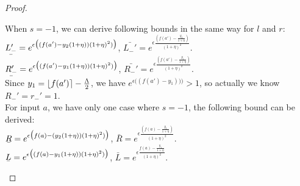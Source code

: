 \documentclass[a4paper,11pt]{article}
\begin{document}
\begin{proof}
\begin{itemize}
		When $s = -1$, we can derive following bounds in the same way for $l$ and $r$:\\
		$\ubar{L_-'} = e^{\epsilon 
				\big( (f(a') - y_2(1 + \eta)) (1 + \eta)^2) \big)}$,
		$\bar{L_-'} = e^{\epsilon 
				\frac{(f(a') - \frac{y_2}{1 + \eta})}{(1 + \eta)^2}}$.\\
		$\ubar{R_-'} = e^{\epsilon 
				\big( (f(a') - y_1(1 + \eta)) (1 + \eta)^2) \big)}$, 
		$\bar{R_-'} = e^{\epsilon 
				\frac{(f(a') - \frac{y_1}{1 + \eta})}{(1 + \eta)^2}}$.\\
		Since $y_1 = \lfloor f(a') \rceil - \frac{\Lambda}{2}$, 
		we have $e^{\epsilon \big( (f(a') - y_1)) \big)} > 1$, so actually we know $R_-' = r_-' = 1$.
		\\
		For input $a$, we have only one case where $s = -1$, the following bound can be derived:
		\\
		$\ubar{R} = e^{\epsilon 
				\big( f(a) - (y_2(1 + \eta)) (1 + \eta)^2) \big)}$, 
		$\bar{R} = e^{\epsilon 
				\frac{(f(a) - \frac{y_2}{1 + \eta})}{(1 + \eta)^2}}$.  
		\\
		$\ubar{L} = e^{\epsilon 
				\big( (f(a) - y_1(1 + \eta)) (1 + \eta)^2) \big)}$, 
		$\bar{L} = e^{\epsilon 
				\frac{f(a) - \frac{y_1}{1 + \eta}}{(1 + \eta)^2}}$.



\end{itemize}
\end{proof}
\end{document}
